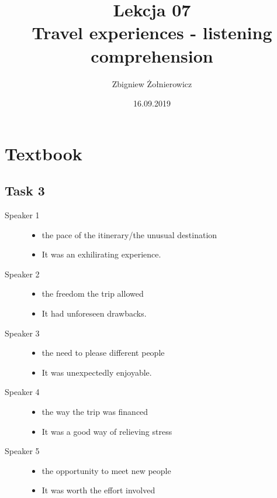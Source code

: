 \documentclass[a4paper]{article}
\begin{document}
\title{{\huge Lekcja 07} \\
{\large Travel experiences - listening comprehension}}
\author{Zbigniew Żołnierowicz}
\date{16.09.2019}
\maketitle
\section*{Textbook}
\subsection*{Task 3}
\begin{description}
    \item[Speaker 1] \begin{itemize}
        \item the pace of the itinerary/the unusual destination
        \item It was an exhilirating experience.
    \end{itemize}
    \item[Speaker 2] \begin{itemize}
        \item the freedom the trip allowed
        \item It had unforeseen drawbacks.
    \end{itemize}
    \item[Speaker 3] \begin{itemize}
        \item the need to please different people
        \item It was unexpectedly enjoyable.
    \end{itemize}
    \item[Speaker 4] \begin{itemize}
        \item the way the trip was financed
        \item It was a good way of relieving stress
    \end{itemize}
    \item[Speaker 5] \begin{itemize}
        \item the opportunity to meet new people
        \item It was worth the effort involved
    \end{itemize}
\end{description}
\end{document}
